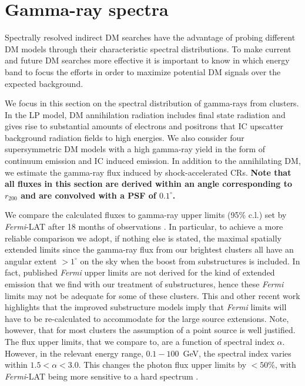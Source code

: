 \documentclass[10pt,aps,pra,reprint,amsmath,amsfonts,amssymb,showpacs,nofootinbib,floatfix]{revtex4-1}
\def\C#1{{\bf #1}}
\newcommand{\Fermi}{{\em Fermi}\xspace}
\newcommand{\degs}{^\circ}
\newcommand{\rvir}{r_{200}}
\begin{document}
\section{Gamma-ray spectra}
\label{sect:spectral}
Spectrally resolved indirect DM searches have the advantage of probing
different DM models through their characteristic spectral
distributions. To make current and future DM searches more effective
it is important to know in which energy band to focus the efforts in
order to maximize potential DM signals over the expected background.

We focus in this section on the spectral distribution of gamma-rays
from clusters. In the LP model, DM annihilation radiation includes
final state radiation and gives rise to substantial amounts of
electrons and positrons that IC upscatter background radiation fields
to high energies. We also consider four supersymmetric DM models with
a high gamma-ray yield in the form of continuum emission and IC
induced emission. In addition to the annihilating DM, we estimate the
gamma-ray flux induced by shock-accelerated CRs. \C{Note that all
  fluxes in this section are derived within an angle corresponding to
  $\rvir$ and are convolved with a PSF of $0.1\degs$.}

We compare the calculated fluxes to gamma-ray upper limits (95\% c.l.)
set by \Fermi-LAT after 18 months of observations
\cite{2010ApJ...717L..71A}. In particular, to achieve a more reliable
comparison we adopt, if nothing else is stated, the maximal spatially
extended limits since the gamma-ray flux from our brightest clusters
all have an angular extent $>1^\circ$ on the sky when the boost from
substructures is included. In fact, published \Fermi upper limits are
not derived for the kind of extended emission that we find with our
treatment of substructures, hence these \Fermi limits may not be
adequate for some of these clusters. This and other recent work
highlights that the improved substructure models imply that \Fermi
limits will have to be re-calculated to accommodate for the large
source extensions. Note, however, that for most clusters the
assumption of a point source is well justified. The flux upper
limits, that we compare to, are a function of spectral index
$\alpha$. However, in the relevant energy range, $0.1-100$~GeV, the
spectral index varies within $1.5 < \alpha < 3.0$. This changes the
photon flux upper limits by $<50\%$, with \Fermi-LAT being more
sensitive to a hard spectrum \cite{2010ApJ...717L..71A}.
\end{document}
